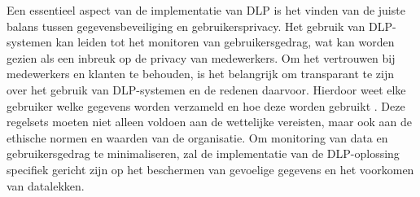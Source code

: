 Een essentieel aspect van de implementatie van DLP is het vinden van de juiste balans tussen gegevensbeveiliging en gebruikersprivacy. 
Het gebruik van DLP-systemen kan leiden tot het monitoren van gebruikersgedrag, wat kan worden gezien als een inbreuk op de privacy van medewerkers. 
Om het vertrouwen bij medewerkers en klanten te behouden, is het belangrijk om transparant te zijn over het gebruik van DLP-systemen en de redenen daarvoor. 
Hierdoor weet elke gebruiker welke gegevens worden verzameld en hoe deze worden gebruikt \autocite{Zaini2024}. 
Deze regelsets moeten niet alleen voldoen aan de wettelijke vereisten, maar ook aan de ethische normen en waarden van de organisatie. 
Om monitoring van data en gebruikersgedrag te minimaliseren, 
zal de implementatie van de DLP-oplossing specifiek gericht zijn op het beschermen van gevoelige gegevens en het voorkomen van datalekken. 







